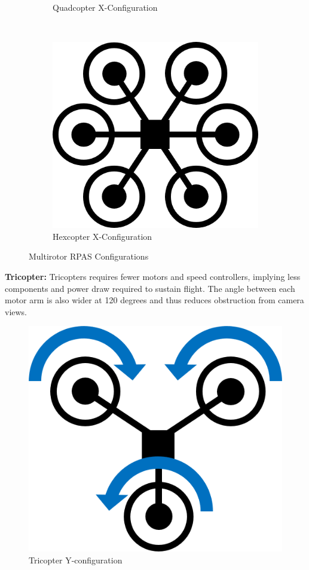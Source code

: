 \begin{figure}[H]
\begin{subfigure}[b]{0.3\textwidth}
        \caption{Quadcopter X-Configuration}
        \label{fig:quadcopter-x}
    \end{subfigure}
    ~
    \begin{subfigure}[b]{0.3\textwidth}
        \centering
        \includegraphics[scale=0.4]{img/drone_hexconfig}
        \caption{Hexcopter X-Configuration}
        \label{fig:hexcopter-x}
    \end{subfigure}
    
    \caption{Multirotor RPAS Configurations}
    \label{fig:rpas_configs}
\end{figure}

\textbf{Tricopter: } Tricopters requires fewer motors and speed controllers, implying less components and power draw required to sustain flight. The angle between each motor arm is also wider at 120 degrees and thus reduces obstruction from camera views. 

\begin{figure}[h]
    \centering
    \includegraphics[scale=0.4]{img/drone_yconfigt}
    \caption{Tricopter Y-configuration}
    \label{fig:tricopter-y-t}
\end{figure}

